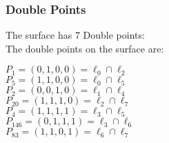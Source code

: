 \documentclass{article}
\begin{document}
{\subsubsection*{Double Points}
The surface has 7 Double points:\\
The double points on the surface are:\\
\begin{multicols}{2}
\noindent
$P_{1} = ( 0, 1, 0, 0 ) = \ell_{0} \cap \ell_{2} $\\
$P_{5} = ( 1, 1, 0, 0 ) = \ell_{0} \cap \ell_{5} $\\
$P_{2} = ( 0, 0, 1, 0 ) = \ell_{1} \cap \ell_{4} $\\
$P_{20} = ( 1, 1, 1, 0 ) = \ell_{2} \cap \ell_{7} $\\
$P_{4} = ( 1, 1, 1, 1 ) = \ell_{3} \cap \ell_{5} $\\
$P_{146} = ( 0, 1, 1, 1 ) = \ell_{3} \cap \ell_{6} $\\
$P_{83} = ( 1, 1, 0, 1 ) = \ell_{6} \cap \ell_{7} $\\
\end{multicols}
}
\end{document}

